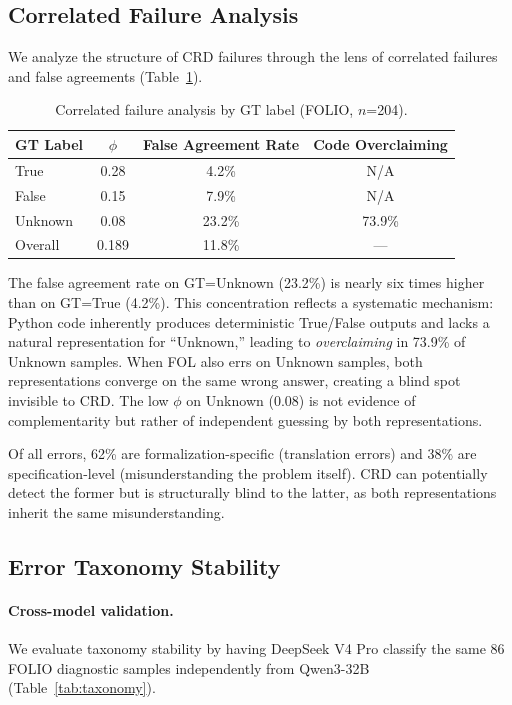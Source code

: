 \documentclass[11pt]{article}
\begin{document}
\subsection{Correlated Failure Analysis}

We analyze the structure of CRD failures through the lens of correlated failures and false agreements (Table~\ref{tab:correlated}).

\begin{table}[t]
\centering
\caption{Correlated failure analysis by GT label (FOLIO, $n$=204).}
\label{tab:correlated}
\begin{tabular}{lccc}
\toprule
GT Label & $\phi$ & False Agreement Rate & Code Overclaiming \\
\midrule
True    & 0.28 & 4.2\%  & N/A \\
False   & 0.15 & 7.9\%  & N/A \\
Unknown & 0.08 & 23.2\% & 73.9\% \\
\midrule
Overall & 0.189 & 11.8\% & --- \\
\bottomrule
\end{tabular}
\end{table}

The false agreement rate on GT=Unknown (23.2\%) is nearly six times higher than on GT=True (4.2\%). This concentration reflects a systematic mechanism: Python code inherently produces deterministic True/False outputs and lacks a natural representation for ``Unknown,'' leading to \emph{overclaiming} in 73.9\% of Unknown samples. When FOL also errs on Unknown samples, both representations converge on the same wrong answer, creating a blind spot invisible to CRD. The low $\phi$ on Unknown (0.08) is not evidence of complementarity but rather of independent guessing by both representations.

Of all errors, 62\% are formalization-specific (translation errors) and 38\% are specification-level (misunderstanding the problem itself). CRD can potentially detect the former but is structurally blind to the latter, as both representations inherit the same misunderstanding.

\subsection{Error Taxonomy Stability}

\paragraph{Cross-model validation.} We evaluate taxonomy stability by having DeepSeek V4 Pro classify the same 86 FOLIO diagnostic samples independently from Qwen3-32B (Table~\ref{tab:taxonomy}).
\end{document}
